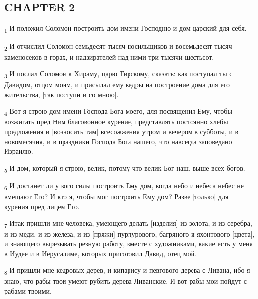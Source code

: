 \subsection{CHAPTER 2}
\begin{tcolorbox}
\textsubscript{1} И положил Соломон построить дом имени Господню и дом царский для себя.
\end{tcolorbox}
\begin{tcolorbox}
\textsubscript{2} И отчислил Соломон семьдесят тысяч носильщиков и восемьдесят тысяч каменосеков в горах, и надзирателей над ними три тысячи шестьсот.
\end{tcolorbox}
\begin{tcolorbox}
\textsubscript{3} И послал Соломон к Хираму, царю Тирскому, сказать: как поступал ты с Давидом, отцом моим, и присылал ему кедры на построение дома для его жительства, [так поступи и со мною].
\end{tcolorbox}
\begin{tcolorbox}
\textsubscript{4} Вот я строю дом имени Господа Бога моего, для посвящения Ему, чтобы возжигать пред Ним благовонное курение, представлять постоянно хлебы предложения и [возносить там] всесожжения утром и вечером в субботы, и в новомесячия, и в праздники Господа Бога нашего, что навсегда заповедано Израилю.
\end{tcolorbox}
\begin{tcolorbox}
\textsubscript{5} И дом, который я строю, велик, потому что велик Бог наш, выше всех богов.
\end{tcolorbox}
\begin{tcolorbox}
\textsubscript{6} И достанет ли у кого силы построить Ему дом, когда небо и небеса небес не вмещают Его? И кто я, чтобы мог построить Ему дом? Разве [только] для курения пред лицем Его.
\end{tcolorbox}
\begin{tcolorbox}
\textsubscript{7} Итак пришли мне человека, умеющего делать [изделия] из золота, и из серебра, и из меди, и из железа, и из [пряжи] пурпурового, багряного и яхонтового [цвета], и знающего вырезывать резную работу, вместе с художниками, какие есть у меня в Иудее и в Иерусалиме, которых приготовил Давид, отец мой.
\end{tcolorbox}
\begin{tcolorbox}
\textsubscript{8} И пришли мне кедровых дерев, и кипарису и певгового дерева с Ливана, ибо я знаю, что рабы твои умеют рубить дерева Ливанские. И вот рабы мои пойдут с рабами твоими,
\end{tcolorbox}
